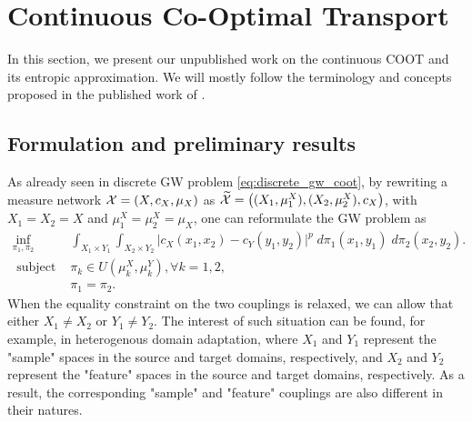 \section{Continuous Co-Optimal Transport}

In this section, we present our unpublished work on the continuous COOT and its entropic approximation.
We will mostly follow the terminology and concepts proposed in the published work of \citep{Chowdhury21b}.

\subsection{Formulation and preliminary results}

As already seen in discrete GW problem \eqref{eq:discrete_gw_coot},
by rewriting a measure network $\mathcal X = (X, c_X, \mu_X)$ as
$\widetilde{\mathcal X} = \big((X_1, \mu_1^X), (X_2, \mu_2^X), c_X \big)$, with
$X_1 = X_2 = X$ and $\mu_1^X = \mu^X_2 = \mu_X$, one can reformulate the GW problem as
\begin{equation}
  \begin{split}
    \inf_{\pi_1, \pi_2}
    &\int_{X_1 \times Y_1} \int_{X_2 \times Y_2}
    \big\vert c_X(x_1, x_2) - c_Y(y_1, y_2) \big\vert^p \; d\pi_1(x_1, y_1) \; d\pi_2(x_2, y_2). \\
    \text{ subject to: } &\pi_k \in U(\mu_k^X, \mu_k^Y), \forall k = 1,2, \\
    &\pi_1 = \pi_2.
  \end{split}
\end{equation}
When the equality constraint on the two couplings is relaxed,
we can allow that either $X_1 \neq X_2$ or $Y_1 \neq Y_2$.
The interest of such situation can be found, for example, in heterogenous domain adaptation,
where $X_1$ and $Y_1$ represent the "sample" spaces in the source and target domains, respectively,
and $X_2$ and $Y_2$ represent the "feature" spaces in the source and target domains, respectively.
As a result, the corresponding "sample" and "feature" couplings are also different in their natures.


